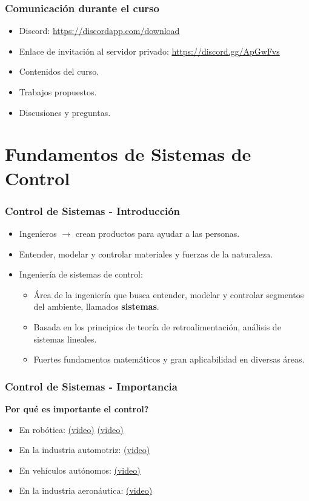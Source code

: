 \documentclass[aspectratio=169]{beamer}
\theoremstyle{definition}
\theoremstyle{plain}
\theoremstyle{remark}
\begin{document}
\begin{frame}[c]\frametitle{Comunicación durante el curso}
\begin{itemize}
  \item Discord: \url{https://discordapp.com/download}
  \item Enlace de invitación al servidor privado: \url{https://discord.gg/ApGwFvs}
  \item Contenidos del curso.
  \item Trabajos propuestos.
  \item Discusiones y preguntas.
\end{itemize}
\end{frame}

\section{Fundamentos de Sistemas de Control}

\begin{frame}[<+->][c]\frametitle{Control de Sistemas - Introducción}
\begin{itemize}
  \item Ingenieros $\rightarrow$ crean productos para ayudar a las personas.
  \item Entender, modelar y controlar materiales y fuerzas de la naturaleza.
  \item Ingeniería de sistemas de control:
  \begin{itemize}
    \item Área de la ingeniería que busca entender, modelar y controlar segmentos del ambiente, llamados \textbf{sistemas}.
    \item Basada en los principios de teoría de retroalimentación, análisis de sistemas lineales.
    \item Fuertes fundamentos matemáticos y gran aplicabilidad en diversas áreas.
  \end{itemize}
\end{itemize}
\end{frame}

\begin{frame}[c]\frametitle{Control de Sistemas - Importancia}
\textbf{Por qué es importante el control?}
\begin{itemize}
  \item En robótica: \href{https://www.youtube.com/watch?v=wlkCQXHEgjA}{(video)} \href{https://www.youtube.com/watch?v=_sBBaNYex3E}{(video)}
  \item En la industria automotriz: \href{https://www.youtube.com/watch?v=rbki4HR41-4}{(video)}
  \item En vehículos autónomos: \href{https://www.youtube.com/watch?v=tlThdr3O5Qo}{(video)}
  \item En la industria aeronáutica: \href{https://www.youtube.com/watch?v=GrP3jHuLQ9o}{(video)}
\end{itemize}
\end{frame}
\end{document}
